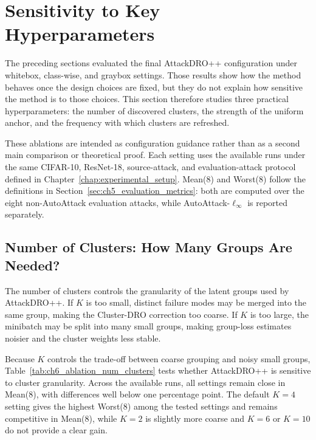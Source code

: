 \section{Sensitivity to Key Hyperparameters}
\label{sec:ch6_ablation}

The preceding sections evaluated the final AttackDRO++ configuration under
whitebox, class-wise, and graybox settings. Those results show how the method
behaves once the design choices are fixed, but they do not explain how sensitive
the method is to those choices. This section therefore studies three practical
hyperparameters: the number of discovered clusters, the strength of the uniform
anchor, and the frequency with which clusters are refreshed.

These ablations are intended as configuration guidance rather than as a second
main comparison or theoretical proof. Each setting uses the available runs under
the same CIFAR-10, ResNet-18, source-attack, and evaluation-attack protocol
defined in Chapter~\ref{chap:experimental_setup}.
Mean(8) and Worst(8) follow the definitions in Section~\ref{sec:ch5_evaluation_metrics}:
both are computed over the eight non-AutoAttack evaluation attacks, while
AutoAttack-$\ell_\infty$ is reported separately.

\subsection{Number of Clusters: How Many Groups Are Needed?}
\label{subsec:ch6_ablation_num_clusters}

The number of clusters controls the granularity of the latent groups used by
AttackDRO++. If $K$ is too small, distinct failure modes may be merged into the
same group, making the Cluster-DRO correction too coarse. If $K$ is too large,
the minibatch may be split into many small groups, making group-loss estimates
noisier and the cluster weights less stable.

Because $K$ controls the trade-off between coarse grouping and noisy small groups,
Table~\ref{tab:ch6_ablation_num_clusters} tests whether AttackDRO++ is sensitive to
cluster granularity. Across the available runs, all settings remain close in Mean(8), with differences
well below one percentage point. The default $K=4$ setting gives the highest
Worst(8) among the tested settings and remains competitive in Mean(8), while
$K=2$ is slightly more coarse and $K=6$ or $K=10$ do not provide a clear gain.


